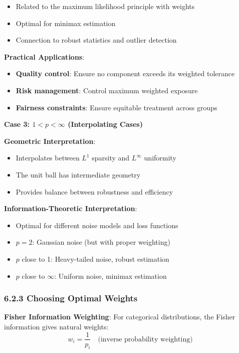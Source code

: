 \documentclass{amsart}
\theoremstyle{plain}
\theoremstyle{definition}
\theoremstyle{remark}
\begin{document}
\begin{itemize}
	\item Related to the maximum likelihood principle with weights
	\item Optimal for minimax estimation
	\item Connection to robust statistics and outlier detection
\end{itemize}

\textbf{Practical Applications}:

\begin{itemize}
	\item \textbf{Quality control}: Ensure no component exceeds its weighted tolerance
	\item \textbf{Risk management}: Control maximum weighted exposure
	\item \textbf{Fairness constraints}: Ensure equitable treatment across groups
\end{itemize}

\textbf{Case 3: $1 < p < \infty$ (Interpolating Cases)}

\textbf{Geometric Interpretation}:

\begin{itemize}
	\item Interpolates between $L^1$ sparsity and $L^\infty$ uniformity
	\item The unit ball has intermediate geometry
	\item Provides balance between robustness and efficiency
\end{itemize}

\textbf{Information-Theoretic Interpretation}:

\begin{itemize}
	\item Optimal for different noise models and loss functions
	\item $p = 2$: Gaussian noise (but with proper weighting)
	\item $p$ close to 1: Heavy-tailed noise, robust estimation
	\item $p$ close to $\infty$: Uniform noise, minimax estimation
\end{itemize}

\subsubsection{6.2.3 Choosing Optimal Weights}

\textbf{Fisher Information Weighting}:
For categorical distributions, the Fisher information gives natural weights:
\[
w_i = \frac{1}{p_i} \quad \text{(inverse probability weighting)}
\]
\end{document}

